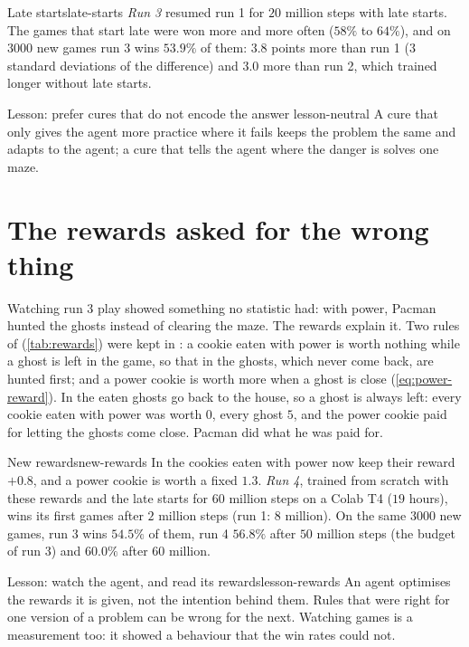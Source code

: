 \begin{pacman}{Late starts}{late-starts}
  \emph{Run 3} resumed run 1 for $20$ million steps with late starts. The
  games that start late were won more and more often ($58\%$ to $64\%$),
  and on $3000$ new games run 3 wins $53.9\%$ of them: $3.8$ points more than
  run 1 ($3$ standard deviations of the difference) and $3.0$ more than
  run 2, which trained longer without late starts.
\end{pacman}

\begin{remark}{Lesson: prefer cures that do not encode the answer}%
  {lesson-neutral}
  A cure that only gives the agent more practice where it fails keeps the
  problem the same and adapts to the agent; a cure that tells the agent
  where the danger is solves one maze.
\end{remark}

\section{The rewards asked for the wrong thing}

Watching run 3 play showed something no statistic had: with power, Pacman
hunted the ghosts instead of clearing the maze. The rewards explain it. Two
rules of  (\cref{tab:rewards}) were kept in : a cookie
eaten with power is worth nothing while a ghost is left in the game, so
that in  the ghosts, which never come back, are hunted first; and
a power cookie is worth more when a ghost is close (\cref{eq:power-reward}).
In  the eaten ghosts go back to the house, so a ghost is always
left: every cookie eaten with power was worth $0$, every ghost $5$, and the
power cookie paid for letting the ghosts come close. Pacman did what he was
paid for.

\begin{pacman}{New rewards}{new-rewards}
  In  the cookies eaten with power now keep their reward $+0.8$,
  and a power cookie is worth a fixed $1.3$. \emph{Run 4}, trained from
  scratch with these rewards and the late starts for $60$ million steps on
  a Colab T4 ($19$ hours), wins its first games after $2$ million steps
  (run 1: $8$ million). On the same $3000$ new games, run 3 wins $54.5\%$ of
  them, run 4 $56.8\%$ after $50$ million steps (the budget of run 3) and
  $60.0\%$ after $60$ million.
\end{pacman}

\begin{remark}{Lesson: watch the agent, and read its rewards}{lesson-rewards}
  An agent optimises the rewards it is given, not the intention behind
  them. Rules that were right for one version of a problem can be wrong
  for the next. Watching games is a measurement too: it showed a
  behaviour that the win rates could not.
\end{remark}

